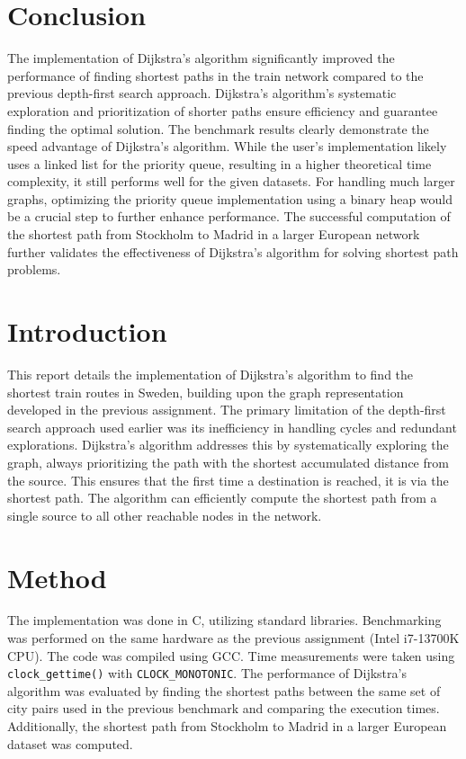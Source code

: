 \documentclass[a4paper,11pt]{article}
\begin{document}
\section*{Conclusion}
The implementation of Dijkstra's algorithm significantly improved the performance of finding shortest paths in the train network compared to the previous depth-first search approach. Dijkstra's algorithm's systematic exploration and prioritization of shorter paths ensure efficiency and guarantee finding the optimal solution. The benchmark results clearly demonstrate the speed advantage of Dijkstra's algorithm. While the user's implementation likely uses a linked list for the priority queue, resulting in a higher theoretical time complexity, it still performs well for the given datasets. For handling much larger graphs, optimizing the priority queue implementation using a binary heap would be a crucial step to further enhance performance. The successful computation of the shortest path from Stockholm to Madrid in a larger European network further validates the effectiveness of Dijkstra's algorithm for solving shortest path problems.
\section*{Introduction}
This report details the implementation of Dijkstra's algorithm to find the shortest train routes in Sweden, building upon the graph representation developed in the previous assignment. The primary limitation of the depth-first search approach used earlier was its inefficiency in handling cycles and redundant explorations. Dijkstra's algorithm addresses this by systematically exploring the graph, always prioritizing the path with the shortest accumulated distance from the source. This ensures that the first time a destination is reached, it is via the shortest path. The algorithm can efficiently compute the shortest path from a single source to all other reachable nodes in the network.

\section*{Method}
The implementation was done in C, utilizing standard libraries. Benchmarking was performed on the same hardware as the previous assignment (Intel i7-13700K CPU). The code was compiled using GCC. Time measurements were taken using \texttt{clock\_gettime()} with \texttt{CLOCK\_MONOTONIC}. The performance of Dijkstra's algorithm was evaluated by finding the shortest paths between the same set of city pairs used in the previous benchmark and comparing the execution times. Additionally, the shortest path from Stockholm to Madrid in a larger European dataset was computed.
\end{document}
